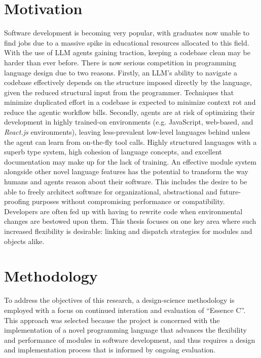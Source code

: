 \documentclass[12pt,a4paper,twoside]{report}
\begin{document}
\section{Motivation}

Software development is becoming very popular, with graduates now unable to find jobs due to a massive spike in educational resources allocated to this field. With the use of LLM agents gaining traction, keeping a codebase clean may be harder than ever before. There is now serious competition in programming language design due to two reasons. Firstly, an LLM's ability to navigate a codebase effectively depends on the structure imposed directly by the language, given the reduced structural input from the programmer. Techniques that minimize duplicated effort in a codebase is expected to minimize context rot and reduce the agentic workflow bills. Secondly, agents are at risk of optimizing their development in highly trained-on environments (e.g. JavaScript, web-based, and \textit{React.js} environments), leaving less-prevalent low-level languages behind unless the agent can learn from on-the-fly tool calls. Highly structured languages with a superb type system, high cohesion of language concepts, and excellent documentation may make up for the lack of training. An effective module system alongside other novel language features has the potential to transform the way humans and agents reason about their software. This includes the desire to be able to freely architect software for organizational, abstractional and future-proofing purposes without compromising performance or compatibility. Developers are often fed up with having to rewrite code when environmental changes are bestowed upon them. This thesis focuses on one key area where such increased flexibility is desirable: linking and dispatch strategies for modules and objects alike.

\section{Methodology}

To address the objectives of this research, a design-science methodology is employed with a focus on continued interation and evaluation of ``Essence C''. This approach was selected because the project is concerned with the implementation of a novel programming language that advances the flexibility and performance of modules in software development, and thus requires a design and implementation process that is informed by ongoing evaluation.
\end{document}
